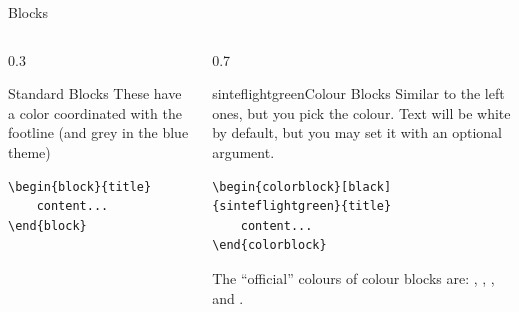 \begin{frame}[fragile]{Blocks}
    \begin{columns}
        \begin{column}{0.3\textwidth}
            \begin{block}{Standard Blocks}
	            \vspace{1em}
                These have a color coordinated with the footline (and grey in the blue theme)
                \begin{verbatim}
\begin{block}{title}
    content...
\end{block}
                \end{verbatim}
            \end{block}
        \end{column}
        \begin{column}{0.7\textwidth}
            \begin{colorblock}[black]{sinteflightgreen}{Colour Blocks}
                Similar to the left ones, but you pick the colour. Text will be white by
                default, but you may set it with an optional argument.
                \small
                \begin{verbatim}
\begin{colorblock}[black]{sinteflightgreen}{title}
    content...
\end{colorblock}
    \end{verbatim}
            \end{colorblock}
            The ``official'' colours of colour blocks are: ,
            , , and
            .
        \end{column}
    \end{columns}
\end{frame}